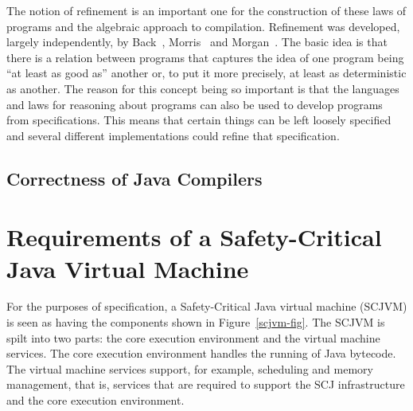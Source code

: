 \documentclass[a4paper,10pt]{article}
\begin{document}
The notion of refinement is an important one for the construction of these laws
of programs and the algebraic approach to compilation.  Refinement was
developed, largely independently, by Back~\cite{back1981},
Morris~\cite{morris1987} and Morgan~\cite{morgan1990}.  The basic idea is that
there is a relation between programs that captures the idea of one program being
``at least as good as'' another or, to put it more precisely, at least as
deterministic as another.  The reason for this concept being so important is
that the languages and laws for reasoning about programs can also be used to
develop programs from specifications.  This means that certain things can be
left loosely specified and several different implementations could refine that
specification. %


\subsection{Correctness of Java Compilers}
\label{java-correctness-sec}

\section{Requirements of a Safety-Critical Java Virtual Machine}
\label{requirements-sec}

For the purposes of specification, a Safety-Critical Java virtual machine
(SCJVM) is seen as having the components shown in Figure~\ref{scjvm-fig}. The
SCJVM is spilt into two parts: the core execution environment and the virtual
machine services. The core execution environment handles the running of Java
bytecode.  The virtual machine services support, for example, scheduling and
memory management, that is, services that are required to support the SCJ
infrastructure and the core execution environment.
\end{document}
